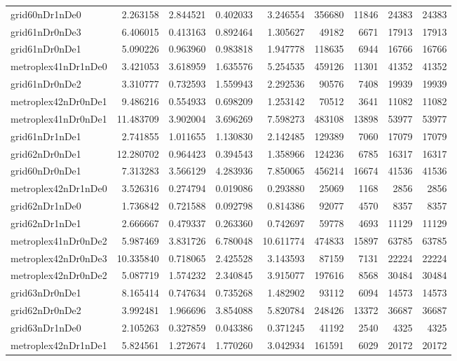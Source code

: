 \begin{longtable}{|l|r|r|r|r|r|r|r|r|}
grid60nDr1nDe0 & 2.263158 & 2.844521 & 0.402033 & 3.246554 & 356680 & 11846 & 24383 & 24383 \\
grid61nDr0nDe3 & 6.406015 & 0.413163 & 0.892464 & 1.305627 & 49182 & 6671 & 17913 & 17913 \\
grid61nDr0nDe1 & 5.090226 & 0.963960 & 0.983818 & 1.947778 & 118635 & 6944 & 16766 & 16766 \\
metroplex41nDr1nDe0 & 3.421053 & 3.618959 & 1.635576 & 5.254535 & 459126 & 11301 & 41352 & 41352 \\
grid61nDr0nDe2 & 3.310777 & 0.732593 & 1.559943 & 2.292536 & 90576 & 7408 & 19939 & 19939 \\
metroplex42nDr0nDe1 & 9.486216 & 0.554933 & 0.698209 & 1.253142 & 70512 & 3641 & 11082 & 11082 \\
metroplex41nDr0nDe1 & 11.483709 & 3.902004 & 3.696269 & 7.598273 & 483108 & 13898 & 53977 & 53977 \\
grid61nDr1nDe1 & 2.741855 & 1.011655 & 1.130830 & 2.142485 & 129389 & 7060 & 17079 & 17079 \\
grid62nDr0nDe1 & 12.280702 & 0.964423 & 0.394543 & 1.358966 & 124236 & 6785 & 16317 & 16317 \\
grid60nDr0nDe1 & 7.313283 & 3.566129 & 4.283936 & 7.850065 & 456214 & 16674 & 41536 & 41536 \\
metroplex42nDr1nDe0 & 3.526316 & 0.274794 & 0.019086 & 0.293880 & 25069 & 1168 & 2856 & 2856 \\
grid62nDr1nDe0 & 1.736842 & 0.721588 & 0.092798 & 0.814386 & 92077 & 4570 & 8357 & 8357 \\
grid62nDr1nDe1 & 2.666667 & 0.479337 & 0.263360 & 0.742697 & 59778 & 4693 & 11129 & 11129 \\
metroplex41nDr0nDe2 & 5.987469 & 3.831726 & 6.780048 & 10.611774 & 474833 & 15897 & 63785 & 63785 \\
metroplex42nDr0nDe3 & 10.335840 & 0.718065 & 2.425528 & 3.143593 & 87159 & 7131 & 22224 & 22224 \\
metroplex42nDr0nDe2 & 5.087719 & 1.574232 & 2.340845 & 3.915077 & 197616 & 8568 & 30484 & 30484 \\
grid63nDr0nDe1 & 8.165414 & 0.747634 & 0.735268 & 1.482902 & 93112 & 6094 & 14573 & 14573 \\
grid62nDr0nDe2 & 3.992481 & 1.966696 & 3.854088 & 5.820784 & 248426 & 13372 & 36687 & 36687 \\
grid63nDr1nDe0 & 2.105263 & 0.327859 & 0.043386 & 0.371245 & 41192 & 2540 & 4325 & 4325 \\
metroplex42nDr1nDe1 & 5.824561 & 1.272674 & 1.770260 & 3.042934 & 161591 & 6029 & 20172 & 20172 \\

\end{longtable}
